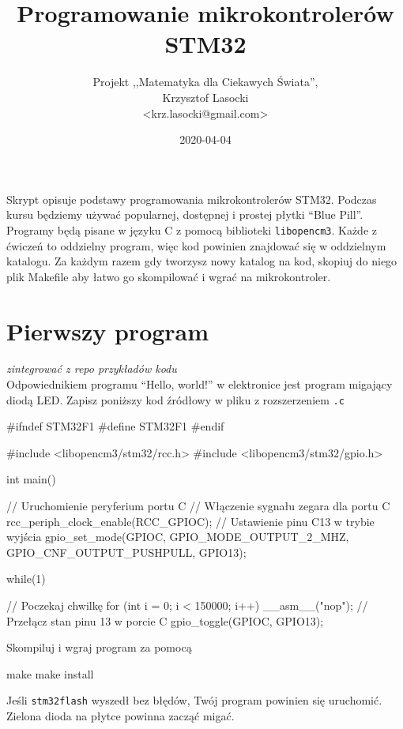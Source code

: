 \documentclass{pdfBooklets}
\title{Programowanie mikrokontrolerów STM32}
\author{%
	Projekt ,,Matematyka dla Ciekawych Świata'',\\
	Krzysztof Lasocki\\\normalsize\ttfamily <krz.lasocki@gmail.com>
}
\date  {2020-04-04}
\begin{document}
\maketitle


Skrypt opisuje podstawy programowania mikrokontrolerów STM32. Podczas kursu będziemy używać
popularnej, dostępnej i prostej płytki ``Blue Pill''. Programy będą pisane w języku
C z pomocą biblioteki \Verb$libopencm3$. Każde z ćwiczeń to oddzielny program, więc kod powinien znajdować się
w oddzielnym katalogu. Za każdym razem gdy tworzysz nowy katalog na kod, skopiuj do niego plik Makefile aby łatwo
go skompilować i wgrać na mikrokontroler.




\section{Pierwszy program}
\textit{zintegrować z repo przykładów kodu}\\
Odpowiednikiem programu ``Hello, world!'' w elektronice jest program migający diodą LED. Zapisz poniższy kod źródłowy w pliku z
rozszerzeniem \Verb$.c$

\begin{CodeFrame*}[c]{}
#ifndef STM32F1
#define STM32F1
#endif


#include <libopencm3/stm32/rcc.h>
#include <libopencm3/stm32/gpio.h>

int main(){
  // Uruchomienie peryferium portu C
  // Włączenie sygnału zegara dla portu C
  rcc_periph_clock_enable(RCC_GPIOC);
  // Ustawienie pinu C13 w trybie wyjścia
  gpio_set_mode(GPIOC, GPIO_MODE_OUTPUT_2_MHZ,
		GPIO_CNF_OUTPUT_PUSHPULL, GPIO13);

  while(1){
    // Poczekaj chwilkę
    for (int i = 0; i < 150000; i++) __asm__("nop");
    // Przełącz stan pinu 13 w porcie C
    gpio_toggle(GPIOC, GPIO13);
      
  }
}
\end{CodeFrame*}

Skompiluj i wgraj program za pomocą

\begin{CodeFrame*}[bash]{}
make
make install
\end{CodeFrame*}

Jeśli \Verb$stm32flash$ wyszedł bez błędów, Twój program powinien się uruchomić. Zielona dioda na płytce powinna zacząć migać.
\end{document}

